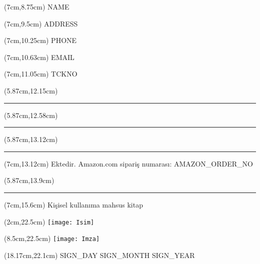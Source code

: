 \documentclass[a4paper]{article}
\begin{document}
\begin{textblock*}{5cm}(7cm,8.75cm) \small {{NAME}} \end{textblock*}
\begin{textblock*}{15cm}(7cm,9.5cm) \small {{ADDRESS}} \end{textblock*}
\begin{textblock*}{15cm}(7cm,10.25cm) \small {{PHONE}} \end{textblock*}
\begin{textblock*}{15cm}(7cm,10.63cm) \small {{EMAIL}} \end{textblock*}
\begin{textblock*}{15cm}(7cm,11.05cm) \small {{TCKNO}} \end{textblock*}
\begin{textblock*}{15cm}(5.87cm,12.15cm) \small {\textcolor{white}{\rule{10cm}{0.34cm}}} \end{textblock*}
\begin{textblock*}{15cm}(5.87cm,12.58cm) \small {\textcolor{white}{\rule{10cm}{0.34cm}}} \end{textblock*}
\begin{textblock*}{15cm}(5.87cm,13.12cm) \small {\textcolor{white}{\rule{10cm}{0.34cm}}} \end{textblock*}
\begin{textblock*}{15cm}(7cm,13.12cm) \small Ektedir. Amazon.com sipariş numarası: {{AMAZON_ORDER_NO}} \end{textblock*}
\begin{textblock*}{15cm}(5.87cm,13.9cm) \small {\textcolor{white}{\rule{10cm}{0.34cm}}} \end{textblock*}
\begin{textblock*}{15cm}(7cm,15.6cm) \small Kişisel kullanıma mahsus kitap \end{textblock*}
\begin{textblock*}{15cm}(2cm,22.5cm) \tiny \texttt{[image: Isim]} \end{textblock*}
\begin{textblock*}{15cm}(8.5cm,22.5cm) \tiny \texttt{[image: Imza]} \end{textblock*}
\begin{textblock*}{15cm}(18.17cm,22.1cm) \small {{SIGN_DAY}} {{SIGN_MONTH}} \hspace{0.5em} {{SIGN_YEAR}}\end{textblock*}

\end{document}
